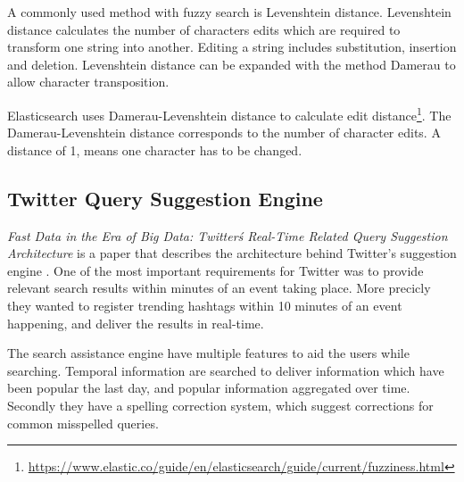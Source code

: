 A commonly used method with fuzzy search is Levenshtein distance.
Levenshtein distance calculates the number of characters edits which are required to transform one string into another.
Editing a string includes substitution, insertion and deletion.
Levenshtein distance can be expanded with the method Damerau to allow character transposition.

Elasticsearch uses Damerau-Levenshtein distance to calculate edit distance\footnote{\url{https://www.elastic.co/guide/en/elasticsearch/guide/current/fuzziness.html}}.
The Damerau-Levenshtein distance corresponds to the number of character edits.
A distance of 1, means one character has to be changed.

\subsection{Twitter Query Suggestion Engine}
\textit{Fast Data in the Era of Big Data: Twitter\'s Real-Time Related Query Suggestion Architecture} is a paper that describes the architecture behind Twitter's suggestion engine \cite{twitter-suggestion}.
One of the most important requirements for Twitter was to provide relevant search results within minutes of an event taking place.
More precicly they wanted to register trending hashtags within 10 minutes of an event happening, and deliver the results in real-time.

The search assistance engine have multiple features to aid the users while searching.
Temporal information are searched to deliver information which have been popular the last day, and popular information aggregated over time.
Secondly they have a spelling correction system, which suggest corrections for common misspelled queries.

